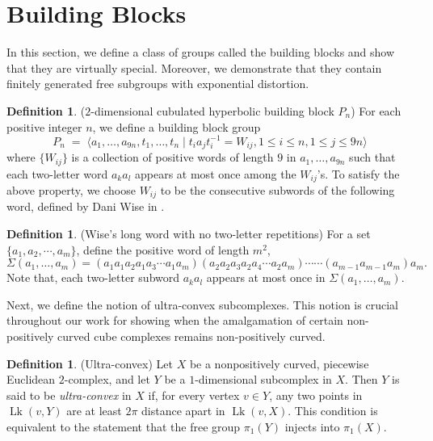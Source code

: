 \documentclass[oneside,11pt,reqno]{amsart}
\theoremstyle{definition}
\newtheorem{defn}[thm]{Definition}
\DeclareMathOperator{\Lk}{Lk}
\begin{document}
\section{Building Blocks}\label{s4}

In this section, we define a class of groups called the building blocks and show that they are virtually special. Moreover, we demonstrate that they contain finitely generated free subgroups with exponential distortion.

\begin{defn}\label{block1} ($2$-dimensional cubulated hyperbolic building block $P_n$)
For each positive integer $n$, we define a building block group $$P_n \;=\; \langle a_1, \ldots, a_{9n}, t_1, \ldots, t_n \;|\; t_ia_jt_i^{-1} = W_{ij}, 1 \leq i \leq n, 1 \leq j \leq 9n \rangle$$ where $\{W_{ij}\}$ is a collection of positive words of length $9$ in $a_1, \ldots, a_{9n}$ such that each two-letter word $a_ka_l$ appears at most once among the $W_{ij}$'s. To satisfy the above property, we choose $W_{ij}$ to be the consecutive subwords of the following word, defined by Dani Wise in \cite{MR1423338}.
\end{defn}

\begin{defn}\label{wiselong} 
(Wise's long word with no two-letter repetitions) 
For a set $\{a_1, a_2, \cdots , a_m\}$, define the positive word of length $m^2$,
$$\Sigma(a_1, \ldots, a_m)= (a_1a_1a_2a_1a_3 \cdots a_1 a_m)(a_2 a_2 a_3 a_2 a_4 \cdots a_2 a_m) \cdots \cdots (a_{m-1} a_{m-1} a_m) a_m.
$$
Note that, each two-letter subword $a_k a_l$  appears at most once in $\Sigma(a_1, \ldots, a_m)$.
\end{defn}

Next, we define the notion of ultra-convex subcomplexes. This notion is crucial throughout our work for showing when the amalgamation of certain non-positively curved cube complexes remains non-positively curved.

\begin{defn} (Ultra-convex)\label{defn:ultra}
\cite{brady2022superexponentialdehnfunctionsinside}
Let $X$ be a nonpositively curved, piecewise Euclidean $2$-complex, and let $Y$ be a $1$-dimensional subcomplex in $X$.
 Then $Y$ is said to be \textit{ultra-convex} in $X$ if, for every vertex $v \in Y$, any two points in  $\Lk(v, Y)$ are at least $2\pi$  distance apart in $\Lk(v, X)$. This condition is equivalent to the statement that the free group $\pi_1(Y)$ injects into $\pi_1(X)$.
\end{defn}
 
\end{document}
